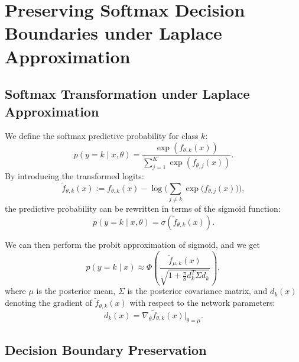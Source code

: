 \documentclass{article}
\begin{document}
\section{Preserving Softmax Decision Boundaries under Laplace Approximation}

\subsection{Softmax Transformation under Laplace Approximation}
We define the softmax predictive probability for class \( k \):
\begin{equation}
p(y = k \mid x, \theta) = \frac{\exp(f_{\theta, k}(x))}{\sum_{j=1}^K \exp(f_{\theta, j}(x))}.
\end{equation}
By introducing the transformed logits:
\begin{equation}
\tilde{f}_{\theta, k}(x) := f_{\theta, k}(x) - \log\Biggl(\sum_{j\neq k} \exp\bigl(f_{\theta, j}(x)\bigr)\Biggr),
\end{equation}
the predictive probability can be rewritten in terms of the sigmoid function:
\begin{equation}
p(y = k \mid x, \theta) = \sigma(\tilde{f}_{\theta,k}(x)).
\end{equation}

We can then perform the probit approximation of sigmoid, and we get
\begin{equation}
    p(y = k \mid x) \approx \Phi(\frac{\tilde{f}_{\mu, k}(x)}{\sqrt{1+\frac{\pi}{8}d_k^{T}\Sigma d_{k}}}),
\end{equation}
where $\mu$ is the posterior mean, $\Sigma$ is the posterior covariance matrix, and \( d_k(x) \) denoting the gradient of \( \tilde{f}_{\theta,k}(x) \) with respect to the network parameters:
\begin{equation}
d_k(x) = \nabla_{\theta} \tilde{f}_{\theta,k}(x) \Big|_{\theta = \mu}.
\end{equation}



\subsection{Decision Boundary Preservation}
\end{document}
